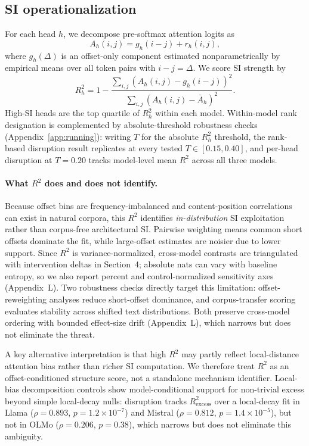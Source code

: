 \documentclass{article}
\begin{document}
\subsection{SI operationalization}
For each head $h$, we decompose pre-softmax attention logits as
\begin{equation}
A_h(i,j) = g_h(i-j) + r_h(i,j),
\end{equation}
where $g_h(\Delta)$ is an offset-only component estimated nonparametrically by empirical means over all token pairs with $i-j=\Delta$. We score SI strength by
\begin{equation}
R_h^2 = 1 - \frac{\sum_{i,j}(A_h(i,j)-g_h(i-j))^2}{\sum_{i,j}(A_h(i,j)-\bar A_h)^2}.
\end{equation}
High-SI heads are the top quartile of $R_h^2$ within each model. Within-model rank designation is complemented by absolute-threshold robustness checks (Appendix~\ref{app:running}): writing $T$ for the absolute $R_h^2$ threshold, the rank-based disruption result replicates at every tested $T\in[0.15,0.40]$, and per-head disruption at $T{=}0.20$ tracks model-level mean $R^2$ across all three models.

\paragraph{What $R^2$ does and does not identify.}
Because offset bins are frequency-imbalanced and content-position correlations can exist in natural corpora, this $R^2$ identifies \emph{in-distribution} SI exploitation rather than corpus-free architectural SI. Pairwise weighting means common short offsets dominate the fit, while large-offset estimates are noisier due to lower support. Since $R^2$ is variance-normalized, cross-model contrasts are triangulated with intervention deltas in Section~4; absolute nats can vary with baseline entropy, so we also report percent and control-normalized sensitivity axes (Appendix~L). Two robustness checks directly target this limitation: offset-reweighting analyses reduce short-offset dominance, and corpus-transfer scoring evaluates stability across shifted text distributions. Both preserve cross-model ordering with bounded effect-size drift (Appendix~L), which narrows but does not eliminate the threat.

A key alternative interpretation is that high $R^2$ may partly reflect local-distance attention bias rather than richer SI computation. We therefore treat $R^2$ as an offset-conditioned structure score, not a standalone mechanism identifier. Local-bias decomposition controls show model-conditional support for non-trivial excess beyond simple local-decay nulls: disruption tracks $R^2_{\text{excess}}$ over a local-decay fit in Llama ($\rho{=}0.893$, $p{=}1.2{\times}10^{-7}$) and Mistral ($\rho{=}0.812$, $p{=}1.4{\times}10^{-5}$), but not in OLMo ($\rho{=}0.206$, $p{=}0.38$), which narrows but does not eliminate this ambiguity.
\end{document}
